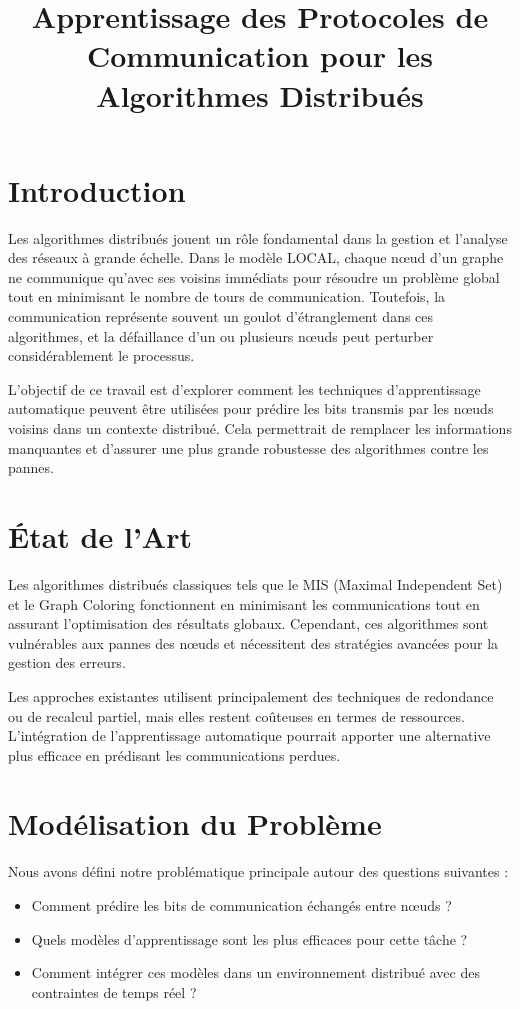 \documentclass[a4paper,12pt]{article}
\title{\textbf{Apprentissage des Protocoles de Communication pour les Algorithmes Distribués}}
\author{}
\date{}
\begin{document}
\maketitle
\newpage

\tableofcontents
\newpage

\section{Introduction}
Les algorithmes distribués jouent un rôle fondamental dans la gestion et l'analyse des réseaux à grande échelle. Dans le modèle LOCAL, chaque nœud d’un graphe ne communique qu’avec ses voisins immédiats pour résoudre un problème global tout en minimisant le nombre de tours de communication. Toutefois, la communication représente souvent un goulot d’étranglement dans ces algorithmes, et la défaillance d’un ou plusieurs nœuds peut perturber considérablement le processus. 

L’objectif de ce travail est d’explorer comment les techniques d’apprentissage automatique peuvent être utilisées pour prédire les bits transmis par les nœuds voisins dans un contexte distribué. Cela permettrait de remplacer les informations manquantes et d’assurer une plus grande robustesse des algorithmes contre les pannes.

\section{État de l’Art}
Les algorithmes distribués classiques tels que le MIS (Maximal Independent Set) et le Graph Coloring fonctionnent en minimisant les communications tout en assurant l’optimisation des résultats globaux. Cependant, ces algorithmes sont vulnérables aux pannes des nœuds et nécessitent des stratégies avancées pour la gestion des erreurs.

Les approches existantes utilisent principalement des techniques de redondance ou de recalcul partiel, mais elles restent coûteuses en termes de ressources. L’intégration de l’apprentissage automatique pourrait apporter une alternative plus efficace en prédisant les communications perdues.

\section{Modélisation du Problème}
Nous avons défini notre problématique principale autour des questions suivantes :
\begin{itemize}
    \item Comment prédire les bits de communication échangés entre nœuds ?
    \item Quels modèles d’apprentissage sont les plus efficaces pour cette tâche ?
    \item Comment intégrer ces modèles dans un environnement distribué avec des contraintes de temps réel ?
\end{itemize}
\end{document}
